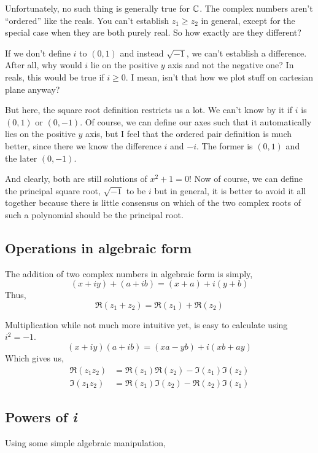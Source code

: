 Unfortunately, no such thing is generally true for \(\mathbb C\). The complex
numbers aren't ``ordered'' like the reals. You can't establish \(z_1 \ge z_2\) in general,
except for the special case when they are both purely real. So how exactly are they different?

If we don't define \(i\) to \((0,1)\) and instead \(\sqrt{-1}\), we can't
establish a difference. After all, why would \(i\) lie on the positive \(y\) axis
and not the negative one? In reals, this would be true if \(i \ge 0\). 
I mean, isn't that how we plot stuff on cartesian plane anyway? 

But here, the square root definition restricts us a lot. We can't know by it if
\(i\) is \((0,1)\) or \((0,-1)\). Of course, we can define our axes such that it
automatically lies on the positive \(y\) axis, but I feel that the ordered pair
definition is much better, since there we know the difference \(i\) and \(-i\). 
The former is \((0, 1)\) and the later \((0, -1)\). 

And clearly, both are still solutions of \(x^2 + 1 = 0\)! Now of course,
we can define the principal square root, \(\sqrt{-1}\) to be \(i\) but in general,
it is better to avoid it all together because there is little consensus on which of the
two complex roots of such a polynomial should be the principal root.

\subsection{Operations in algebraic form}

The addition of two complex numbers in algebraic form is simply,
\[(x + iy) + (a + ib) = (x+a) + i(y+b)\] Thus, 
\[\Re(z_1 + z_2) = \Re(z_1) + \Re(z_2)\]

Multiplication while not much more intuitive yet, is easy to calculate using \(i^2 = -1\).
\[(x+iy)(a+ib) = (xa - yb) + i(xb + ay)\] Which gives us,
\begin{align*}
    \Re(z_1z_2) &= \Re(z_1)\Re(z_2) - \Im(z_1)\Im(z_2) \\
    \Im(z_1z_2) &= \Re(z_1)\Im(z_2) - \Re(z_2)\Im(z_1)
\end{align*}

\subsection{Powers of \emph{i}}

Using some simple algebraic manipulation,

